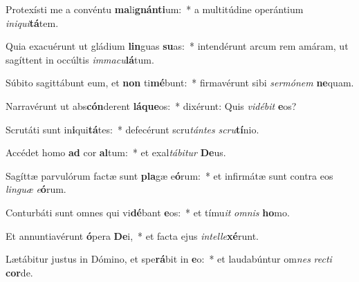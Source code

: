 \item Protexísti me a convéntu \textbf{ma}li\textbf{gnán}\textbf{ti}um:~* a multitúdine operántium \textit{in}\textit{i}\textit{qui}\textbf{tá}tem.
\item Quia exacuérunt ut gládium \textbf{lin}guas \textbf{su}as:~* intendérunt arcum rem amáram, ut sagíttent in occúltis \textit{im}\textit{ma}\textit{cu}\textbf{lá}tum.
\item Súbito sagittábunt eum, et \textbf{non} ti\textbf{mé}bunt:~* firmavérunt sibi \textit{ser}\textit{mó}\textit{nem} \textbf{ne}quam.
\item Narravérunt ut abs\textbf{cón}derent \textbf{lá}\textbf{que}os:~* dixérunt: Quis \textit{vi}\textit{dé}\textit{bit} \textbf{e}os?
\item Scrutáti sunt in\textbf{i}qui\textbf{tá}tes:~* defecérunt scru\textit{tán}\textit{tes} \textit{scru}\textbf{tí}nio.
\item Accédet homo \textbf{ad} cor \textbf{al}tum:~* et exal\textit{tá}\textit{bi}\textit{tur} \textbf{De}us.
\item Sagíttæ parvulórum factæ sunt \textbf{pla}gæ e\textbf{ó}rum:~* et infirmátæ sunt contra eos \textit{lin}\textit{guæ} \textit{e}\textbf{ó}rum.
\item Conturbáti sunt omnes qui vi\textbf{dé}bant \textbf{e}os:~* et tímu\textit{it} \textit{om}\textit{nis} \textbf{ho}mo.
\item Et annuntiavérunt \textbf{ó}pera \textbf{De}i,~* et facta ejus \textit{in}\textit{tel}\textit{le}\textbf{xé}runt.
\item Lætábitur justus in Dómino, et spe\textbf{rá}bit in \textbf{e}o:~* et laudabúntur om\textit{nes} \textit{rec}\textit{ti} \textbf{cor}de.
